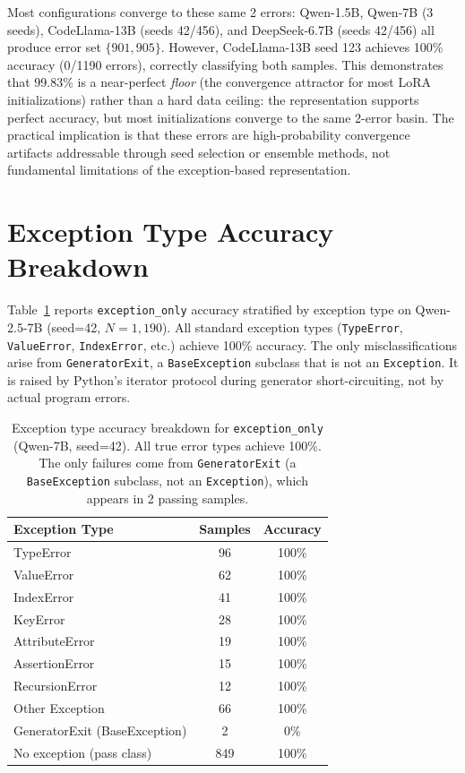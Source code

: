 Most configurations converge to these same 2 errors: Qwen-1.5B, Qwen-7B (3 seeds), CodeLlama-13B (seeds 42/456), and DeepSeek-6.7B (seeds 42/456) all produce error set $\{901, 905\}$.
However, CodeLlama-13B seed 123 achieves 100\% accuracy (0/1190 errors), correctly classifying both samples.
This demonstrates that 99.83\% is a near-perfect \emph{floor} (the convergence attractor for most LoRA initializations) rather than a hard data ceiling: the representation supports perfect accuracy, but most initializations converge to the same 2-error basin.
The practical implication is that these errors are high-probability convergence artifacts addressable through seed selection or ensemble methods, not fundamental limitations of the exception-based representation.

\section{Exception Type Accuracy Breakdown}
\label{sec:exception_type}

Table~\ref{tab:exception_type} reports \texttt{exception\_only} accuracy stratified by exception type on Qwen-2.5-7B (seed=42, $N{=}1{,}190$).
All standard exception types (\texttt{TypeError}, \texttt{ValueError}, \texttt{IndexError}, etc.) achieve 100\% accuracy.
The only misclassifications arise from \texttt{GeneratorExit}, a \texttt{BaseException} subclass that is not an \texttt{Exception}. It is raised by Python's iterator protocol during generator short-circuiting, not by actual program errors.

\begin{table}[t]
\centering
\caption{Exception type accuracy breakdown for \texttt{exception\_only} (Qwen-7B, seed=42). All true error types achieve 100\%. The only failures come from \texttt{GeneratorExit} (a \texttt{BaseException} subclass, not an \texttt{Exception}), which appears in 2 passing samples.}
\label{tab:exception_type}
\small
\begin{tabular}{lcc}
\toprule
\textbf{Exception Type} & \textbf{Samples} & \textbf{Accuracy} \\
\midrule
TypeError & 96 & 100\% \\
ValueError & 62 & 100\% \\
IndexError & 41 & 100\% \\
KeyError & 28 & 100\% \\
AttributeError & 19 & 100\% \\
AssertionError & 15 & 100\% \\
RecursionError & 12 & 100\% \\
Other Exception & 66 & 100\% \\
\midrule
GeneratorExit (BaseException) & 2 & 0\% \\
No exception (pass class) & 849 & 100\% \\
\bottomrule
\end{tabular}
\end{table}

